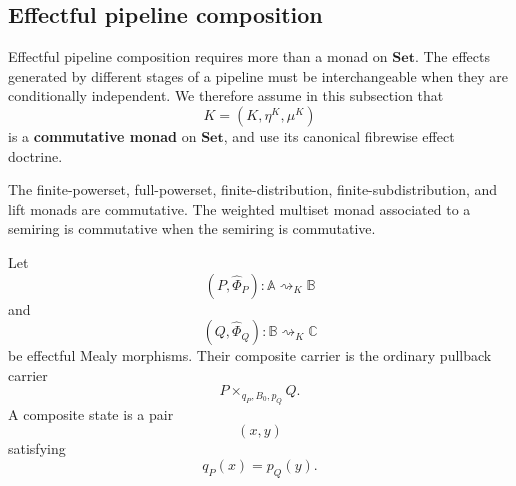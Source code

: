 \subsection{Effectful pipeline composition}
\label{subsec:effectful-pipeline-composition}

Effectful pipeline composition requires more than a monad on
\(\mathbf{Set}\). The effects generated by different stages of a pipeline must
be interchangeable when they are conditionally independent. We therefore
assume in this subsection that
\[
    K=(K,\eta^K,\mu^K)
\]
is a \textbf{commutative monad} on \(\mathbf{Set}\), and use its canonical
fibrewise effect doctrine.

The finite-powerset, full-powerset, finite-distribution,
finite-subdistribution, and lift monads are commutative. The weighted multiset
monad associated to a semiring is commutative when the semiring is
commutative.

Let
\[
    (P,\widehat\Phi_P):
    \mathbb A\rightsquigarrow_K\mathbb B
\]
and
\[
    (Q,\widehat\Phi_Q):
    \mathbb B\rightsquigarrow_K\mathbb C
\]
be effectful Mealy morphisms. Their composite carrier is the ordinary
pullback carrier
\[
    P\times_{q_P,B_0,p_Q}Q.
\]
A composite state is a pair
\[
    (x,y)
\]
satisfying
\[
    q_P(x)=p_Q(y).
\]


